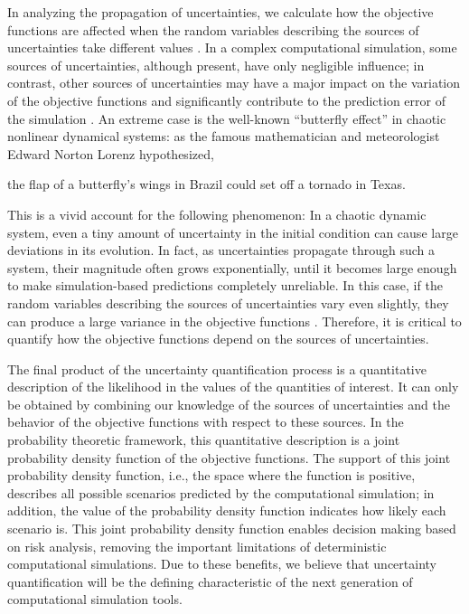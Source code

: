 In analyzing the propagation of uncertainties, we calculate how the objective
functions are affected when the random variables describing the sources of
uncertainties take different values \cite[]{response_sur}.
In a complex computational simulation, some sources of uncertainties,
although present, have only negligible influence; in contrast,
other sources of uncertainties may have a major impact on the variation of the
objective
functions and significantly contribute to the prediction error of the
simulation \cite[]{chaotic}.
An extreme case is the well-known ``butterfly effect'' in chaotic
nonlinear dynamical systems:
as the famous mathematician and meteorologist Edward Norton Lorenz hypothesized,
\begin{it}
the flap of a butterfly's wings in Brazil could set off a tornado in Texas.
\end{it}
This is a vivid account for the following phenomenon: In a chaotic dynamic
system, even a tiny amount of uncertainty in the initial
condition can cause large deviations in its evolution.
In fact, as uncertainties propagate through such a system, their
magnitude often grows exponentially, until it becomes large enough to make
simulation-based predictions completely unreliable.  In this case, 
if the random variables describing the sources of uncertainties vary even
slightly, they can produce a large variance
in the objective functions \cite[]{chaotic}.
Therefore, it is critical to quantify
how the objective functions depend on the sources of uncertainties.

The final product of the uncertainty quantification
process is a quantitative description of the likelihood in the values of the
quantities of interest.  It can only be obtained by combining our knowledge of
the sources of uncertainties and the behavior of the objective functions with
respect to these sources.
In the probability theoretic framework, this quantitative
description is a joint probability density function of the
objective functions.  The support of this joint probability density function,
i.e., the space where the function is positive, describes all possible
scenarios predicted by the computational simulation; in addition, the value
of the probability density function indicates how likely each scenario is.
This joint probability density function enables
decision making based on risk analysis, removing the important limitations of
deterministic computational simulations.  Due to these benefits,
we believe that uncertainty quantification will be the defining
characteristic of the next generation of computational simulation tools.



